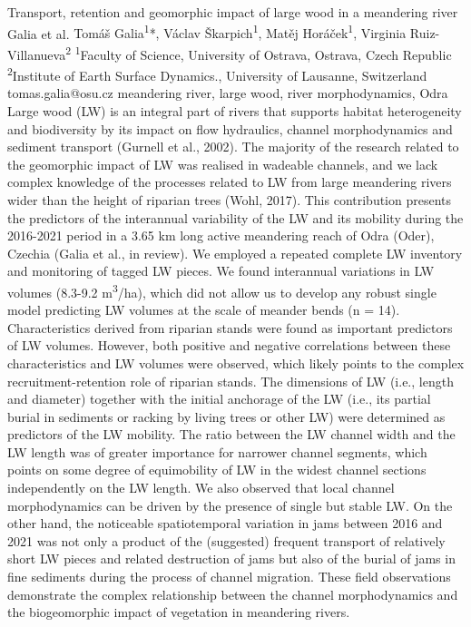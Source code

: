 \abstract
{Transport, retention and geomorphic impact of large wood in a meandering river} %
{Galia et al.} %
{Tomáš Galia\textsuperscript{1}*, Václav Škarpich\textsuperscript{1}, Matěj Horáček\textsuperscript{1}, Virginia Ruiz-Villanueva\textsuperscript{2}} %
{\TLtag} %
{\textsuperscript{1}Faculty of Science, University of Ostrava, Ostrava, Czech Republic\\
\textsuperscript{2}Institute of Earth Surface Dynamics., University of Lausanne, Switzerland
} %
{tomas.galia@osu.cz}  %
{meandering river, large wood, river morphodynamics, Odra}%
{Large wood (LW) is an integral part of rivers that supports habitat heterogeneity and biodiversity by its impact on flow hydraulics, channel morphodynamics and sediment transport (Gurnell et al., 2002). The majority of the research related to the geomorphic impact of LW was realised in wadeable channels, and we lack complex knowledge of the processes related to LW from large meandering rivers wider than the height of riparian trees (Wohl, 2017). This contribution presents the predictors of the interannual variability of the LW and its mobility during the 2016-2021 period in a 3.65 km long active meandering reach of Odra (Oder), Czechia (Galia et al., in review). We employed a repeated complete LW inventory and monitoring of tagged LW pieces. We found interannual variations in LW volumes (8.3-9.2 m\textsuperscript{3}/ha), which did not allow us to develop any robust single model predicting LW volumes at the scale of meander bends (n = 14). Characteristics derived from riparian stands were found as important predictors of LW volumes. However, both positive and negative correlations between these characteristics and LW volumes were observed, which likely points to the complex recruitment-retention role of riparian stands. The dimensions of LW (i.e., length and diameter) together with the initial anchorage of the LW (i.e., its partial burial in sediments or racking by living trees or other LW) were determined as predictors of the LW mobility. The ratio between the LW channel width and the LW length was of greater importance for narrower channel segments, which points on some degree of equimobility of LW in the widest channel sections independently on the LW length. We also observed that local channel morphodynamics can be driven by the presence of single but stable LW. On the other hand, the noticeable spatiotemporal variation in jams between 2016 and 2021 was not only a product of the (suggested) frequent transport of relatively short LW pieces and related destruction of jams but also of the burial of jams in fine sediments during the process of channel migration. These field observations demonstrate the complex relationship between the channel morphodynamics and the biogeomorphic impact of vegetation in meandering rivers.
}%
